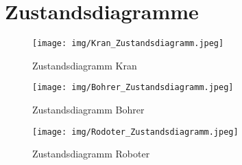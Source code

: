 \chapter{Zustandsdiagramme}
\label{ch:Zustandsdiagramme}


\begin{figure}[h]
	\begin{center}
		\texttt{[image: img/Kran\_Zustandsdiagramm.jpeg]}
		\caption{Zustandsdiagramm Kran}
		\label{Feinkonzept}
	\end{center}
\end{figure}
\begin{figure}[h]
	\begin{center}
		\texttt{[image: img/Bohrer\_Zustandsdiagramm.jpeg]}
		\caption{Zustandsdiagramm Bohrer}
		\label{Feinkonzept}
	\end{center}
\end{figure}
\begin{figure}[h]
	\begin{center}
		\texttt{[image: img/Rodoter\_Zustandsdiagramm.jpeg]}
		\caption{Zustandsdiagramm Roboter}
		\label{Feinkonzept}
	\end{center}
\end{figure}
